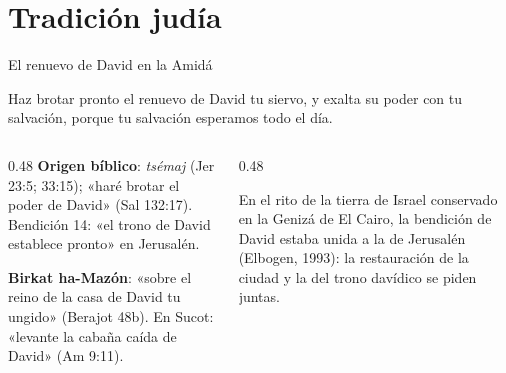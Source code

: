 \section{Tradición judía}
\begin{frame}{El renuevo de David en la Amidá}
\par\smallskip
\begin{cita}Haz brotar pronto el renuevo de David tu siervo, y exalta su poder con tu salvación, porque tu salvación esperamos todo el día.\end{cita}
\begin{columns}[T,onlytextwidth]
\begin{column}{0.48\textwidth}\footnotesize
\textbf{\textcolor{cafe}{Origen bíblico}}: \emph{tsémaj} (Jer 23:5; 33:15); «haré brotar el poder de David» (Sal 132:17). Bendición 14: «el trono de David establece pronto» en Jerusalén.\par\medskip
\textbf{\textcolor{cafe}{Birkat ha-Mazón}}: «sobre el reino de la casa de David tu ungido» (Berajot 48b). En Sucot: «levante la cabaña caída de David» (Am 9:11).
\end{column}
\begin{column}{0.48\textwidth}
\begin{notalam}
En el rito de la tierra de Israel conservado en la Genizá de El Cairo, la bendición de David estaba unida a la de Jerusalén (Elbogen, 1993): la restauración de la ciudad y la del trono davídico se piden juntas.
\end{notalam}
\end{column}
\end{columns}
\end{frame}

